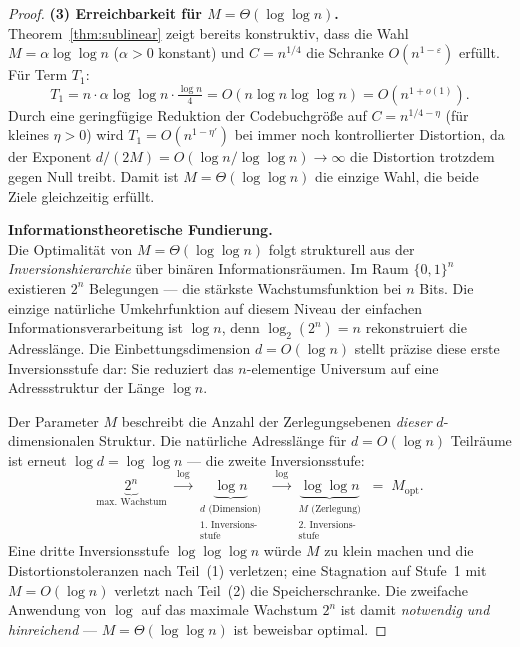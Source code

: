 ﻿\documentclass[12pt,a4paper]{article}
\begin{document}
\begin{proof}
\medskip
\textbf{(3) Erreichbarkeit für $M = \Theta(\log\log n)$.}\\
Theorem~\ref{thm:sublinear} zeigt bereits konstruktiv, dass die 
Wahl $M = \alpha \log\log n$ ($\alpha > 0$ konstant) und 
$C = n^{1/4}$ die Schranke $O(n^{1-\varepsilon})$ erfüllt.
Für Term $T_1$:
\[
  T_1 = n \cdot \alpha\log\log n \cdot \tfrac{\log n}{4}
      = O\!\left(n \log n \log\log n\right)
      = O\!\left(n^{1+o(1)}\right).
\]
Durch eine geringfügige Reduktion der Codebuchgröße auf 
$C = n^{1/4-\eta}$ (für kleines $\eta > 0$) wird $T_1 = O(n^{1-\eta'})$ 
bei immer noch kontrollierter Distortion, da der Exponent 
$d/(2M) = O(\log n / \log\log n) \to \infty$ die Distortion trotzdem 
gegen Null treibt. Damit ist $M = \Theta(\log\log n)$ die einzige 
Wahl, die beide Ziele gleichzeitig erfüllt.

\medskip
\textbf{Informationstheoretische Fundierung.}\\
Die Optimalität von $M = \Theta(\log\log n)$ folgt strukturell aus 
der \emph{Inversionshierarchie} über binären Informationsräumen.
Im Raum $\{0,1\}^n$ existieren $2^n$ Belegungen --- die stärkste 
Wachstumsfunktion bei $n$ Bits. Die einzige natürliche Umkehrfunktion 
auf diesem Niveau der einfachen Informationsverarbeitung ist 
$\log n$, denn $\log_2(2^n) = n$ rekonstruiert die Adresslänge. 
Die Einbettungsdimension $d = O(\log n)$ stellt präzise diese erste 
Inversionsstufe dar: Sie reduziert das $n$-elementige Universum 
auf eine Adressstruktur der Länge $\log n$.

Der Parameter $M$ beschreibt die Anzahl der Zerlegungsebenen 
\emph{dieser} $d$-dimensionalen Struktur. Die natürliche Adresslänge 
für $d = O(\log n)$ Teilräume ist erneut $\log d = \log\log n$ --- 
die zweite Inversionsstufe:
\[
  \underbrace{2^n}_{\text{max.\ Wachstum}}
  \;\xrightarrow{\;\log\;}
  \underbrace{\log n}_{\substack{d\text{ (Dimension)}\\\text{1.~Inversions-}\\\text{stufe}}}
  \;\xrightarrow{\;\log\;}
  \underbrace{\log\log n}_{\substack{M\text{ (Zerlegung)}\\\text{2.~Inversions-}\\\text{stufe}}}
  \;=\; M_{\mathrm{opt}}.
\]
Eine dritte Inversionsstufe $\log\log\log n$ würde $M$ zu klein machen 
und die Distortionstoleranzen nach Teil~(1) verletzen; eine Stagnation 
auf Stufe~1 mit $M = O(\log n)$ verletzt nach Teil~(2) die 
Speicherschranke. Die zweifache Anwendung von $\log$ auf das maximale 
Wachstum $2^n$ ist damit \emph{notwendig und hinreichend} --- 
$M = \Theta(\log\log n)$ ist beweisbar optimal.
\end{proof}
\end{document}
